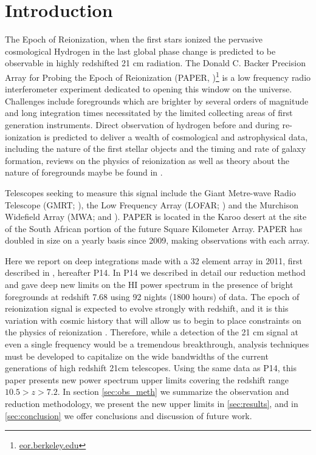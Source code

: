 \documentclass[preprint]{aastex}
\begin{document}


\section{Introduction}
The Epoch of Reionization, when the first stars ionized the pervasive cosmological Hydrogen in the last global phase change is predicted to be observable in highly redshifted 21 cm radiation.  The Donald C. Backer Precision Array for Probing the Epoch of Reionization (PAPER, \cite{Parsons:2010p6757})\footnote{\url{eor.berkeley.edu}} is a low frequency radio interferometer experiment dedicated to opening this window on the universe.  Challenges include foregrounds which are brighter by several orders of magnitude and long integration times necessitated by the limited collecting areas of first generation instruments. Direct observation of hydrogen before and during re-ionization is predicted to deliver a wealth of cosmological and astrophysical data, including the nature of the first stellar objects and the timing and rate of galaxy formation, reviews on the physics of reionization as well as theory about the nature of foregrounds maybe be found in \citet{Furlanetto:2006p2267,Morales:2010p8093,Pritchard:2012p9555}.  

Telescopes seeking to measure this signal include the Giant Metre-wave Radio Telescope (GMRT; \cite{Paciga:2013p9943}), the Low Frequency Array (LOFAR; \cite{Yatawatta:2013p9699}) and the Murchison Widefield Array (MWA; \cite{Bowman:2013p9950} and \cite{Tingay:2013p9022}). PAPER is located in the Karoo desert at the site of the South African portion of the future Square Kilometer Array. PAPER has doubled in size on a yearly basis since 2009, making observations with each array.  


Here we report on deep integrations made with a 32 element array in 2011, first described in \cite{Parsons:2013p9876}, hereafter P14.  In P14 we described in detail our reduction method and gave deep new limits on the HI power spectrum in the presence of bright foregrounds at redshift 7.68 using 92 nights (1800 hours) of data.  The epoch of reionization signal is expected to evolve strongly with redshift, and it is this variation with cosmic history that will allow us to begin to place constraints on the physics of reionization \cite{Pritchard:2008p8123,Pober:2014p10390}.  Therefore, while a detection of the 21 cm signal at even a single frequency would be a tremendous breakthrough, analysis techniques must be developed to capitalize on the wide bandwidths of the current generations of high redshift 21cm telescopes.  Using the same data as P14, this paper presents new power spectrum upper limits covering the redshift range $10.5>z>7.2$.  In section  \ref{sec:obs_meth} we summarize the observation and reduction methodology, we present the new upper limits in \ref{sec:results}, and in \ref{sec:conclusion} we offer conclusions and discussion of future work.
\end{document}
